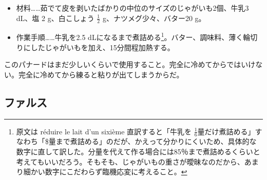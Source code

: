 \begin{recette}
\begin{itemize}
\item
  材料\ldots{}\ldots{}茹でて皮を剥いたばかりの中位のサイズのじゃがいも2個、牛乳3
  dL、塩 2 g、白こしょう \(\frac{1}{2}\) g、ナツメグ少々、バター20 g。
\item
  作業手順\ldots{}\ldots{}牛乳を2.5 dLになるまで煮詰める\footnote{原文は
    réduire le lait d'un sixième 直訳すると「牛乳を
    \(\frac{1}{6}\)量だけ煮詰める」すなわち「\$量まで煮詰める」のだが、かえって分かりにくいため、具体的な数字に直して訳した。分量を代えて作る場合には85％まで煮詰めるくらいと考えてもいいだろう。そもそも、じゃがいもの重さが曖昧なのだから、あまり細かい数字にこだわらず臨機応変に考えること。}。バター、調味料、薄く輪切りにしたじゃがいもを加え、15分間程加熱する。
\end{itemize}

このパナードはまだ少しいくらいで使用すること。完全に冷めてからではいけない。完全に冷めてから練ると粘りが出てしまうからだ。
\end{recette}
\hypertarget{farces}{%
\subsection{ファルス}\label{farces}}


 

